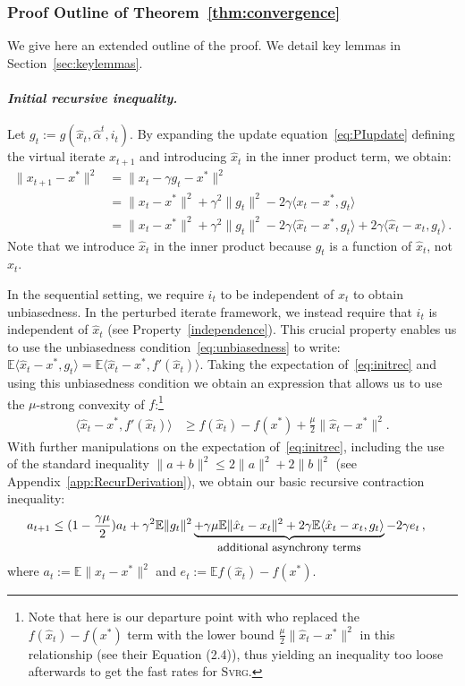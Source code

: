 \documentclass[twoside, 11pt]{article}
\newcommand{\stepsize}{\gamma}
\newcommand{\strongconvex}{\mu}
\newcommand{\E}{\mathbb{E}}
\newcommand{\SVRG}{\textsc{Svrg}}
\begin{document}
\subsubsection{Proof Outline of Theorem~\ref{thm:convergence}}\label{proofoutline}
We give here an extended outline of the proof.
We detail key lemmas in Section~\ref{sec:keylemmas}.

\paragraph{\textit{Initial recursive inequality.}}
Let $g_t := g(\hat x_t, \hat \alpha^t, i_t)$. By expanding the update equation~\eqref{eq:PIupdate} defining the virtual iterate $x_{t+1}$ and introducing $\hat x_t$ in the inner product term, we obtain:
\begin{align}\label{eq:initrec}
\|x_{t+1} - x^*\|^2
&= \|x_t -\stepsize g_t -x^*\|^2
\nonumber\\
&= \|x_t -x^*\|^2 + \stepsize^2 \|g_t\|^2  -2\stepsize\langle x_t -x^*,  g_t\rangle
\nonumber\\
&= \|x_t -x^*\|^2 + \stepsize^2 \|g_t\|^2
-2\stepsize\langle \hat x_t -x^*,  g_t\rangle +2\stepsize\langle \hat x_t -x_t,  g_t\rangle  \, .
\end{align}
Note that we introduce $\hat x_t$ in the inner product because $g_t$ is a function of $\hat x_t$, not $x_t$.

In the sequential setting, we require $i_t$ to be independent of $x_t$ to obtain unbiasedness.
In the perturbed iterate framework, we instead require that $i_t$ is independent of $\hat x_t$ (see Property~\ref{independence}).
This crucial property enables us to use the unbiasedness condition~\eqref{eq:unbiasedness} to write:
$\E \langle \hat x_t -x^*,  g_t\rangle
= \E \langle \hat x_t -x^*,  f'(\hat x_t)\rangle$. Taking the expectation of~\eqref{eq:initrec} and using this unbiasedness condition we obtain an expression that allows us to use the $\mu$-strong convexity of $f$:\footnote{Note that here is our departure point with \citet{mania} who replaced the $f(\hat{x}_t)-f(x^*)$ term with the lower bound $\frac{\strongconvex}{2}\|\hat x_t - x^*\|^2$ in this relationship (see their Equation (2.4)), thus yielding an inequality too loose afterwards to get the fast rates for \SVRG.}
\begin{align} \label{eq:strongconvexity}
\langle \hat x_t -x^*,  f'(\hat x_t)\rangle &\geq f(\hat x_t) -f(x^*) +\frac{\strongconvex}{2}\|\hat x_t - x^*\|^2 .
\end{align}
With further manipulations on the expectation of~\eqref{eq:initrec}, including the use of the standard inequality $\|a + b\|^2 \leq 2\|a\|^2 + 2\|b\|^2$ (see Appendix~\ref{app:RecurDerivation}), we obtain our basic recursive contraction inequality:
\begin{align} \label{eq:RecursiveIneq1}
a_{t+1} &\leq
(1 -\frac{\stepsize \strongconvex}{2}) a_t
+ \stepsize^2 \E \|g_t\|^2
\underbrace{
	+ \stepsize\strongconvex \E\|\hat x_t - x_t\|^2
	+ 2\stepsize \E \langle \hat x_t -x_t,  g_t\rangle
}_{\text{\small additional asynchrony terms}}
-2\stepsize e_t  \, ,
\end{align}
where $a_t := \E \|x_t - x^*\|^2$ and $e_t := \E f(\hat x_t) - f(x^*)$.
\end{document}
